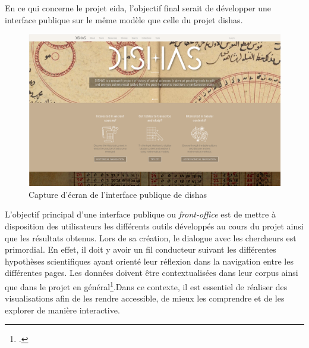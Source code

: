 En ce qui concerne le projet \gls{eida}, l'objectif final serait de développer une interface publique sur le même modèle que celle du projet \gls{dishas}.

\begin{figure}[H]
	\centering
	\includegraphics[width=1\textwidth]{images/dishas.png}
	\caption{Capture d'écran de l'interface publique de \gls{dishas}}
	\label{fig:dishas-interface}
\end{figure}

L'objectif principal d'une interface publique ou \textit{front-office} est de mettre à disposition des utilisateurs les différents outils développés au cours du projet ainsi que les résultats obtenus. Lors de sa création, le dialogue avec les chercheurs est primordial. En effet, il doit y avoir un \og fil conducteur \fg suivant les différentes hypothèses scientifiques ayant orienté leur réflexion dans la navigation entre les différentes pages. Les données doivent être contextualisées dans leur corpus ainsi que dans le projet en général\footcite{albouyMediationDonneesRecherche2019}.Dans ce contexte, il est essentiel de réaliser des visualisations afin de les rendre accessible, de mieux les comprendre et de les explorer de manière interactive. 